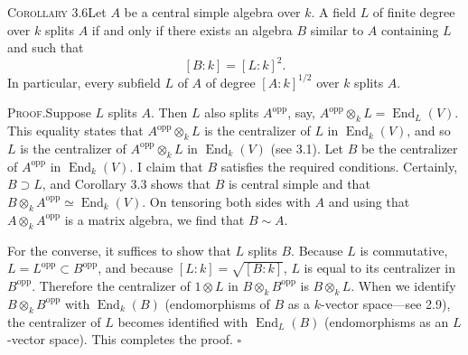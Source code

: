 \noindent\textsc{Corollary 3.6}\quad Let $A$ be a central simple algebra over $k$. A field $L$ of finite degree over $k$ splits $A$ if and only if there exists an algebra $B$ similar to $A$ containing $L$ and such that
\[
[B:k]=[L:k]^2. \tag{37}
\]
In particular, every subfield $L$ of $A$ of degree $[A:k]^{1/2}$ over $k$ splits $A$.

\noindent\textsc{Proof.}\quad Suppose $L$ splits $A$. Then $L$ also splits $A^{\mathrm{opp}}$, say, $A^{\mathrm{opp}}\otimes_k L=\operatorname{End}_L(V)$. This equality states that $A^{\mathrm{opp}}\otimes_k L$ is the centralizer of $L$ in $\operatorname{End}_k(V)$, and so $L$ is the centralizer of $A^{\mathrm{opp}}\otimes_k L$ in $\operatorname{End}_k(V)$ (see 3.1). Let $B$ be the centralizer of $A^{\mathrm{opp}}$ in $\operatorname{End}_k(V)$. I claim that $B$ satisfies the required conditions. Certainly, $B\supset L$, and Corollary 3.3 shows that $B$ is central simple and that $B\otimes_k A^{\mathrm{opp}}\simeq\operatorname{End}_k(V)$. On tensoring both sides with $A$ and using that $A\otimes_k A^{\mathrm{opp}}$ is a matrix algebra, we find that $B\sim A$.

For the converse, it suffices to show that $L$ splits $B$. Because $L$ is commutative, $L=L^{\mathrm{opp}}\subset B^{\mathrm{opp}}$, and because $[L:k]=\sqrt{[B:k]}$, $L$ is equal to its centralizer in $B^{\mathrm{opp}}$. Therefore the centralizer of $1\otimes L$ in $B\otimes_k B^{\mathrm{opp}}$ is $B\otimes_k L$. When we identify $B\otimes_k B^{\mathrm{opp}}$ with $\operatorname{End}_k(B)$ (endomorphisms of $B$ as a $k$-vector space---see 2.9), the centralizer of $L$ becomes identified with $\operatorname{End}_L(B)$ (endomorphisms as an $L$-vector space). This completes the proof. \hfill$\square$
